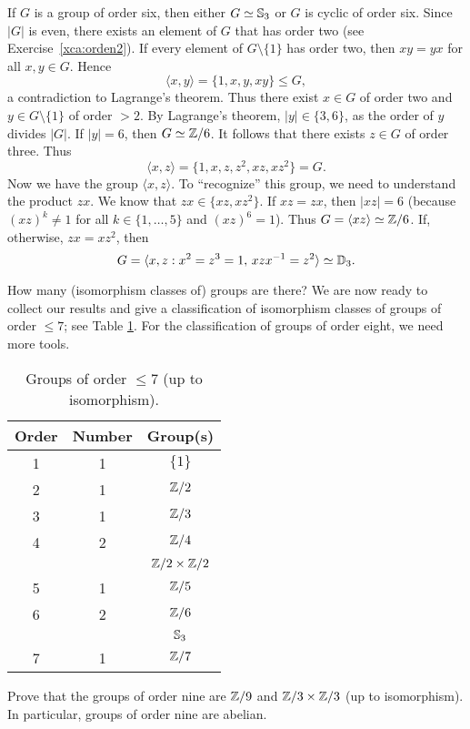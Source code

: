 \begin{example}
If $G$ is a group of order six, then
either $G\simeq\mathbb{S}_3$ or $G$ is cyclic of order six. 
Since $|G|$ is even, there exists an element of $G$ 
that has order two (see Exercise~\ref{xca:orden2}). 
If every element of $G\setminus\{1\}$ has order two, then
$xy=yx$ for all $x,y\in G$. Hence 
\[
\langle x,y\rangle=\{1,x,y,xy\}\leq G,
\]
a contradiction to Lagrange's theorem. Thus there exist 
$x\in G$ of order two 
and $y\in G\setminus\{1\}$ of order $>2$. 
By Lagrange's theorem, $|y|\in\{3,6\}$, 
as the order of $y$ divides $|G|$. If 
$|y|=6$, 
then $G\simeq\mathbb{Z}/6$. It follows that there exists 
$z\in G$ of order three. Thus 
\[
\langle x,z\rangle=\{1,x,z,z^2,xz,xz^2\}=G.
\]
Now we have the group $\langle x,z\rangle$. To ``recognize'' this group,
we need to understand the product $zx$. We know that
$zx\in\{xz,xz^2\}$. If $xz=zx$, then $|xz|=6$ (because
$(xz)^k\ne1$ for all $k\in\{1,\dots,5\}$ and
$(xz)^6=1$). Thus 
$G=\langle xz\rangle\simeq\mathbb{Z}/6$. If, otherwise, 
$zx=xz^2$, then 
\[
G=\langle x,z:x^2=z^3=1,\,xzx^{-1}=z^2\rangle\simeq\mathbb{D}_3.
\]
\end{example}

How many (isomorphism classes of) groups are there? We are now 
ready to collect our results and give a classification 
of isomorphism classes of groups of order $\leq7$; see
Table \ref{tab:grupos<8}. For the classification of groups
of order eight, we need more tools. 

\begin{table}[ht]
    \caption{Groups of order $\leq7$ (up to isomorphism).}

    \begin{tabular}{|c|c|c|}
    \hline
    Order & Number & Group(s)\\
    \hline
        1 & 1 & $\{1\}$ \\
        2 & 1 & $\mathbb{Z}/2$ \\
        3 & 1 & $\mathbb{Z}/3$ \\
        4 & 2 & $\mathbb{Z}/4$ \\
        && $\mathbb{Z}/2\times\mathbb{Z}/2$ \\
        5 & 1 & $\mathbb{Z}/5$ \\
        6 & 2 & $\mathbb{Z}/6$\\
        &&$\mathbb{S}_3$ \\
        7 & 1 & $\mathbb{Z}/7$ \\
    \hline
    \end{tabular}
    \label{tab:grupos<8}
\end{table}

\begin{exercise}
\label{xca:size9}
Prove that the groups of order nine are 
$\mathbb{Z}/9$ and $\mathbb{Z}/3\times\mathbb{Z}/3$ (up to isomorphism). In particular, groups of order
nine are abelian. 
\end{exercise}

